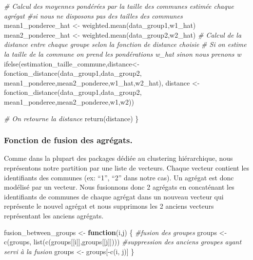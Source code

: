 \documentclass[
]{article}
\newenvironment{Shaded}{\begin{snugshade}}{\end{snugshade}}
\newcommand{\CommentTok}[1]{\textcolor[rgb]{0.56,0.35,0.01}{\textit{#1}}}
\newcommand{\ControlFlowTok}[1]{\textcolor[rgb]{0.13,0.29,0.53}{\textbf{#1}}}
\newcommand{\FunctionTok}[1]{\textcolor[rgb]{0.00,0.00,0.00}{#1}}
\newcommand{\NormalTok}[1]{#1}
\newcommand{\OtherTok}[1]{\textcolor[rgb]{0.56,0.35,0.01}{#1}}
\newcommand{\SpecialCharTok}[1]{\textcolor[rgb]{0.00,0.00,0.00}{#1}}
\begin{document}
\begin{Shaded}
\begin{Highlighting}[]
  \CommentTok{\# Calcul des moyennes pondérées par la taille des communes estimée chaque agrégat}
  \CommentTok{\#si nous ne disposons pas des tailles des communes}
\NormalTok{  mean1\_ponderee\_hat }\OtherTok{\textless{}{-}} \FunctionTok{weighted.mean}\NormalTok{(data\_group1,w1\_hat)}
\NormalTok{  mean2\_ponderee\_hat }\OtherTok{\textless{}{-}} \FunctionTok{weighted.mean}\NormalTok{(data\_group2,w2\_hat)}
  \CommentTok{\# Calcul de la distance entre chaque groupe selon la fonction de distance choisie}
  \CommentTok{\# Si on estime la taille de la commune on prend les pondérations w\_hat sinon nous prenons w}
  \FunctionTok{ifelse}\NormalTok{(estimation\_taille\_commune,distance}\OtherTok{\textless{}{-}}\FunctionTok{fonction\_distance}\NormalTok{(data\_group1,data\_group2,}
\NormalTok{                                                               mean1\_ponderee,mean2\_ponderee,w1\_hat,w2\_hat),}
\NormalTok{         distance }\OtherTok{\textless{}{-}} \FunctionTok{fonction\_distance}\NormalTok{(data\_group1,data\_group2,}
\NormalTok{                                       mean1\_ponderee,mean2\_ponderee,w1,w2))}
  
  \CommentTok{\# On retourne la distance}
  \FunctionTok{return}\NormalTok{(distance)}
\NormalTok{\}}
\end{Highlighting}
\end{Shaded}

\hypertarget{fonction-de-fusion-des-agruxe9gats.}{%
\subsubsection{Fonction de fusion des
agrégats.}\label{fonction-de-fusion-des-agruxe9gats.}}

Comme dans la plupart des packages dédiée au clustering hiérarchique,
nous représentons notre partition par une liste de vecteurs. Chaque
vecteur contient les identifiants des communes (ex: ``1'', ``2'' dans
notre cas). Un agrégat est donc modélisé par un vecteur. Nous fusionnons
donc 2 agrégats en concaténant les identifiants de communes de chaque
agrégat dans un nouveau vecteur qui représente le nouvel agrégat et nous
supprimons les 2 anciens vecteurs représentant les anciens agrégats.

\begin{Shaded}
\begin{Highlighting}[]
\NormalTok{fusion\_between\_groups }\OtherTok{\textless{}{-}} \ControlFlowTok{function}\NormalTok{(i,j) \{}
  \CommentTok{\#fusion des groupes}
\NormalTok{  groups }\OtherTok{\textless{}{-}} \FunctionTok{c}\NormalTok{(groups, }\FunctionTok{list}\NormalTok{(}\FunctionTok{c}\NormalTok{(groups[[i]],groups[[j]])))}
  \CommentTok{\#suppression des anciens groupes ayant servi à la fusion}
\NormalTok{  groups }\OtherTok{\textless{}{-}}\NormalTok{ groups[}\SpecialCharTok{{-}}\FunctionTok{c}\NormalTok{(i, j)]}
\NormalTok{\}}
\end{Highlighting}
\end{Shaded}
\end{document}
